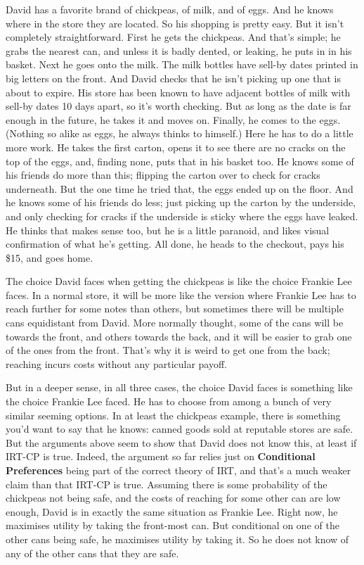 \documentclass[11pt,]{book}
\begin{document}
David has a favorite brand of chickpeas, of milk, and of eggs. And he knows where in the store they are located. So his shopping is pretty easy. But it isn't completely straightforward. First he gets the chickpeas. And that's simple; he grabs the nearest can, and unless it is badly dented, or leaking, he puts in in his basket. Next he goes onto the milk. The milk bottles have sell-by dates printed in big letters on the front. And David checks that he isn't picking up one that is about to expire. His store has been known to have adjacent bottles of milk with sell-by dates 10 days apart, so it's worth checking. But as long as the date is far enough in the future, he takes it and moves on. Finally, he comes to the eggs. (Nothing so alike as eggs, he always thinks to himself.) Here he has to do a little more work. He takes the first carton, opens it to see there are no cracks on the top of the eggs, and, finding none, puts that in his basket too. He knows some of his friends do more than this; flipping the carton over to check for cracks underneath. But the one time he tried that, the eggs ended up on the floor. And he knows some of his friends do less; just picking up the carton by the underside, and only checking for cracks if the underside is sticky where the eggs have leaked. He thinks that makes sense too, but he is a little paranoid, and likes visual confirmation of what he's getting. All done, he heads to the checkout, pays his \$15, and goes home.

The choice David faces when getting the chickpeas is like the choice Frankie Lee faces. In a normal store, it will be more like the version where Frankie Lee has to reach further for some notes than others, but sometimes there will be multiple cans equidistant from David. More normally thought, some of the cans will be towards the front, and others towards the back, and it will be easier to grab one of the ones from the front. That's why it is weird to get one from the back; reaching incurs costs without any particular payoff.

But in a deeper sense, in all three cases, the choice David faces is something like the choice Frankie Lee faced. He has to choose from among a bunch of very similar seeming options. In at least the chickpeas example, there is something you'd want to say that he knows: canned goods sold at reputable stores are safe. But the arguments above seem to show that David does not know this, at least if IRT-CP is true. Indeed, the argument so far relies just on \textbf{Conditional Preferences} being part of the correct theory of IRT, and that's a much weaker claim than that IRT-CP is true. Assuming there is some probability of the chickpeas not being safe, and the costs of reaching for some other can are low enough, David is in exactly the same situation as Frankie Lee. Right now, he maximises utility by taking the front-most can. But conditional on one of the other cans being safe, he maximises utility by taking it. So he does not know of any of the other cans that they are safe.
\end{document}
